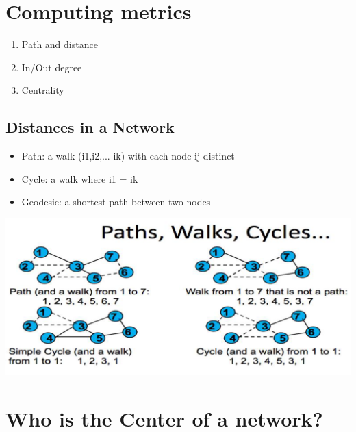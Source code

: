 \documentclass[11pt]{article}
\theoremstyle{definition}
\begin{document}
\section{Computing metrics}
\begin{enumerate}
    \item Path and distance
    \item In/Out degree
    \item Centrality
\end{enumerate}

\subsection{Distances in a Network}
\begin{itemize}
    \item Path: a walk (i1,i2,... ik) with each node ij distinct
    \item Cycle: a walk where i1 = ik
    \item Geodesic: a shortest path between two nodes
\end{itemize}

\includegraphics[width=\textwidth/2]{12.png}

\section{Who is the Center of a network?}
\end{document}
